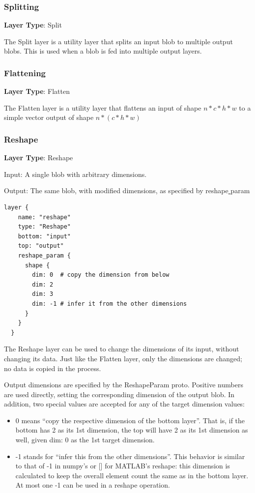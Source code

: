 \documentclass[12pt]{article}
\begin{document}
\subsubsection{Splitting}

\noindent \textbf{Layer Type}: Split

The Split layer is a utility layer that splits an input blob to multiple output blobs. This is used when a blob is fed into multiple output layers.

\subsubsection{Flattening}

\noindent \textbf{Layer Type}: Flatten

The Flatten layer is a utility layer that flattens an input of shape $n * c * h * w$ to a simple vector output of shape $n * (c*h*w)$

\subsubsection{Reshape}

\noindent \textbf{Layer Type}: Reshape

\noindent Input: A single blob with arbitrary dimensions.

\noindent Output: The same blob, with modified dimensions, as specified by reshape\underline{{ }{ }}param

\begin{lstlisting}[style=json, frame=single]
 layer {
    name: "reshape"
    type: "Reshape"
    bottom: "input"
    top: "output"
    reshape_param {
      shape {
        dim: 0  # copy the dimension from below
        dim: 2
        dim: 3
        dim: -1 # infer it from the other dimensions
      }
    }
  }
\end{lstlisting}

The Reshape layer can be used to change the dimensions of its input, without changing its data. Just like the Flatten layer, only the dimensions are changed; no data is copied in the process.

Output dimensions are specified by the ReshapeParam proto. Positive numbers are used directly, setting the corresponding dimension of the output blob. In addition, two special values are accepted for any of the target dimension values:

\begin{itemize}
  \item 0 means “copy the respective dimension of the bottom layer”. That is, if the bottom has 2 as its 1st dimension, the top will have 2 as its 1st dimension as well, given dim: 0 as the 1st target dimension.
  \item -1 stands for “infer this from the other dimensions”. This behavior is similar to that of -1 in numpy’s or [] for MATLAB’s reshape: this dimension is calculated to keep the overall element count the same as in the bottom layer. At most one -1 can be used in a reshape operation.
\end{itemize}
\end{document}
